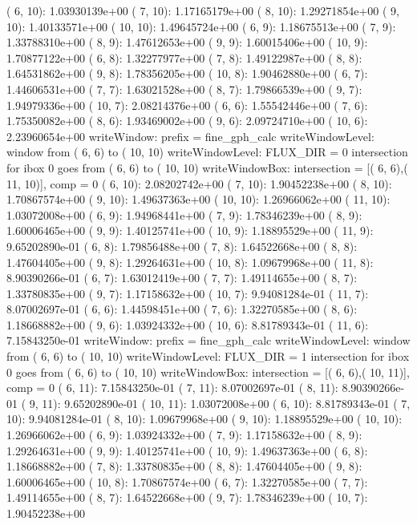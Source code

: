 \begin{itemize}
(  6, 10): 1.03930139e+00  (  7, 10): 1.17165179e+00  (  8, 10): 1.29271854e+00  (  9, 10): 1.40133571e+00  ( 10, 10): 1.49645724e+00  
(  6,  9): 1.18675513e+00  (  7,  9): 1.33788310e+00  (  8,  9): 1.47612653e+00  (  9,  9): 1.60015406e+00  ( 10,  9): 1.70877122e+00  
(  6,  8): 1.32277977e+00  (  7,  8): 1.49122987e+00  (  8,  8): 1.64531862e+00  (  9,  8): 1.78356205e+00  ( 10,  8): 1.90462880e+00  
(  6,  7): 1.44606531e+00  (  7,  7): 1.63021528e+00  (  8,  7): 1.79866539e+00  (  9,  7): 1.94979336e+00  ( 10,  7): 2.08214376e+00  
(  6,  6): 1.55542446e+00  (  7,  6): 1.75350082e+00  (  8,  6): 1.93469002e+00  (  9,  6): 2.09724710e+00  ( 10,  6): 2.23960654e+00  
writeWindow: prefix = fine_gph_calc      
writeWindowLevel:  window from (  6,  6) to ( 10, 10)
writeWindowLevel: FLUX_DIR = 0
 intersection for ibox  0 goes from (  6,  6) to ( 10, 10)
writeWindowBox: intersection = [(  6,  6),( 11, 10)], comp = 0
(  6, 10): 2.08202742e+00  (  7, 10): 1.90452238e+00  (  8, 10): 1.70867574e+00  (  9, 10): 1.49637363e+00  ( 10, 10): 1.26966062e+00  ( 11, 10): 1.03072008e+00  
(  6,  9): 1.94968441e+00  (  7,  9): 1.78346239e+00  (  8,  9): 1.60006465e+00  (  9,  9): 1.40125741e+00  ( 10,  9): 1.18895529e+00  ( 11,  9): 9.65202890e-01  
(  6,  8): 1.79856488e+00  (  7,  8): 1.64522668e+00  (  8,  8): 1.47604405e+00  (  9,  8): 1.29264631e+00  ( 10,  8): 1.09679968e+00  ( 11,  8): 8.90390266e-01  
(  6,  7): 1.63012419e+00  (  7,  7): 1.49114655e+00  (  8,  7): 1.33780835e+00  (  9,  7): 1.17158632e+00  ( 10,  7): 9.94081284e-01  ( 11,  7): 8.07002697e-01  
(  6,  6): 1.44598451e+00  (  7,  6): 1.32270585e+00  (  8,  6): 1.18668882e+00  (  9,  6): 1.03924332e+00  ( 10,  6): 8.81789343e-01  ( 11,  6): 7.15843250e-01  
writeWindow: prefix = fine_gph_calc      
writeWindowLevel:  window from (  6,  6) to ( 10, 10)
writeWindowLevel: FLUX_DIR = 1
 intersection for ibox  0 goes from (  6,  6) to ( 10, 10)
writeWindowBox: intersection = [(  6,  6),( 10, 11)], comp = 0
(  6, 11): 7.15843250e-01  (  7, 11): 8.07002697e-01  (  8, 11): 8.90390266e-01  (  9, 11): 9.65202890e-01  ( 10, 11): 1.03072008e+00  
(  6, 10): 8.81789343e-01  (  7, 10): 9.94081284e-01  (  8, 10): 1.09679968e+00  (  9, 10): 1.18895529e+00  ( 10, 10): 1.26966062e+00  
(  6,  9): 1.03924332e+00  (  7,  9): 1.17158632e+00  (  8,  9): 1.29264631e+00  (  9,  9): 1.40125741e+00  ( 10,  9): 1.49637363e+00  
(  6,  8): 1.18668882e+00  (  7,  8): 1.33780835e+00  (  8,  8): 1.47604405e+00  (  9,  8): 1.60006465e+00  ( 10,  8): 1.70867574e+00  
(  6,  7): 1.32270585e+00  (  7,  7): 1.49114655e+00  (  8,  7): 1.64522668e+00  (  9,  7): 1.78346239e+00  ( 10,  7): 1.90452238e+00  

\end{itemize}
